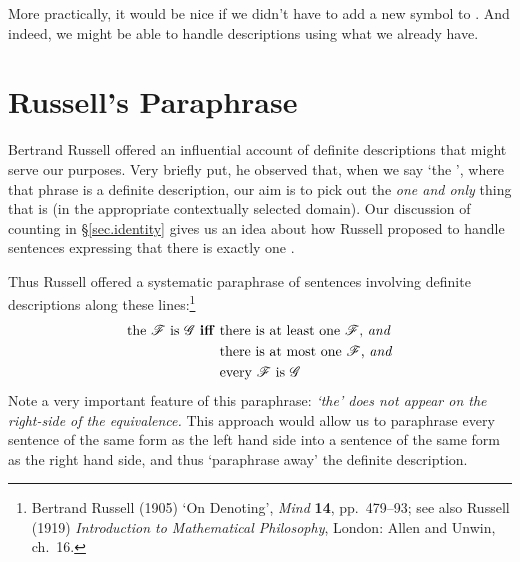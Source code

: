 More practically, it would be nice if we didn't have to add a new symbol to \FOL. And indeed, we might be able to handle descriptions using what we already have.

\section{Russell's Paraphrase}
Bertrand Russell offered an influential account of definite descriptions that might serve our purposes. Very briefly put, he observed that, when we say `the ', where that phrase is a definite description, our aim is to pick out the \emph{one and only} thing that is  (in the appropriate contextually selected domain). Our discussion of counting in §\ref{sec.identity} gives us an idea about how Russell proposed to handle sentences expressing that there is exactly one .

Thus Russell offered a systematic paraphrase of sentences involving definite descriptions along these lines:\footnote{Bertrand Russell (1905) `On Denoting', \emph{Mind} \textbf{14}, pp.\ 479–93; see also Russell (1919) \emph{Introduction to Mathematical Philosophy}, London: Allen and Unwin, ch.\ 16.}
	\begin{align*}
		\text{the \ensuremath{\mathscr{F}} is \ensuremath{\mathscr{G}} \textbf{iff} }&\text{there is at least one \ensuremath{\mathscr{F}}, \emph{and}}\\
	&\text{there is at most one \ensuremath{\mathscr{F}}, \emph{and}}\\	
	&\text{every \ensuremath{\mathscr{F}} is \ensuremath{\mathscr{G}}}
\end{align*}
Note a very important feature of this paraphrase: \emph{`the' does not appear on the right-side of the equivalence.} This approach would allow us to paraphrase every sentence of the same form as the left hand side into a sentence of the same form as the right hand side, and thus `paraphrase away' the definite description. 

